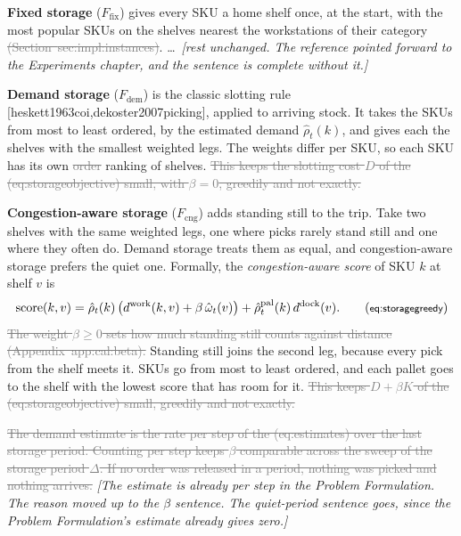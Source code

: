 \documentclass[11pt,a4paper]{article}
\newcommand{\new}[1]{\textcolor{newc}{#1}}
\newcommand{\old}[1]{\textcolor{gray}{\sout{#1}}}
\newcommand{\note}[1]{{\small\itshape [#1]}}
\newcommand{\lab}[1]{\textsf{\footnotesize #1}}
\renewcommand{\ref}[1]{\lab{#1}}
\newcommand{\nref}[1]{the (\lab{#1})}
\newcommand{\citep}[1]{[\lab{#1}]}
\begin{document}
\textbf{Fixed storage} ($F_{\mathrm{fix}}$) gives every SKU a home shelf
once, at the start, with the most popular SKUs on the shelves nearest the
workstations of their category\old{ (Section~\ref{sec:impl:instances})}.
\dots\ \note{rest unchanged. The reference pointed forward to the
Experiments chapter, and the sentence is complete without it.}

\textbf{Demand storage} ($F_{\mathrm{dem}}$) is the classic slotting rule
\citep{heskett1963coi,dekoster2007picking}, applied to arriving stock. It
takes the SKUs from most to least ordered, by the estimated demand
$\hat\rho_t(k)$, and gives each the shelves with the smallest weighted
legs. The weights differ per SKU, so each SKU has its own \old{order}
\new{ranking} of shelves. \old{This keeps the slotting cost $D$ of
\nref{eq:storageobjective} small, with $\beta=0$, greedily and not
exactly.}

\textbf{Congestion-aware storage} ($F_{\mathrm{cng}}$) adds standing still to
the trip. Take two shelves with the same weighted legs, one where picks
rarely stand still and one where they often do. Demand storage treats them
as equal, and congestion-aware storage prefers the quiet one. Formally, the
\emph{congestion-aware score} of SKU $k$ at shelf $v$ is
\begin{equation*}
  \mathrm{score}(k,v) = \hat\rho_t(k)\,\bigl(d^{\mathrm{work}}(k,v)
  + \beta\,\hat\omega_t(v)\bigr) + \hat\rho^{\mathrm{pal}}_t(k)\,d^{\mathrm{dock}}(v) .
  \tag{\lab{eq:storagegreedy}}
\end{equation*}
\old{The weight $\beta \ge 0$ sets how much standing still counts against
distance (Appendix~\ref{app:cal:beta}).} Standing still joins the second
leg, because every pick from the shelf meets it. SKUs go from most to least
ordered, and each pallet goes to the shelf with the lowest score that has
room for it. \old{This keeps $D+\beta K$ of \nref{eq:storageobjective}
small, greedily and not exactly.}

\old{The demand estimate is the rate per step of \nref{eq:estimates} over
the last storage period. Counting per step keeps $\beta$ comparable across
the sweep of the storage period $\Delta$. If no order was released in a
period, nothing was picked and nothing arrives.} \note{The estimate is
already per step in the Problem Formulation. The reason moved up to the
$\beta$ sentence. The quiet-period sentence goes, since the Problem
Formulation's estimate already gives zero.}
\end{document}
